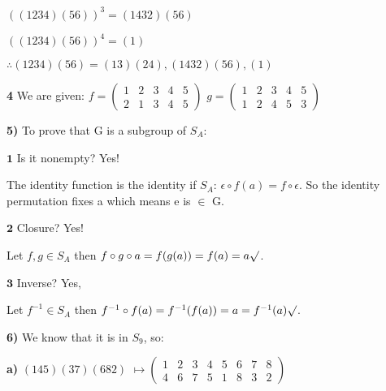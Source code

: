 \documentclass{article}
\begin{document}
\bigskip

$((1234)(56))^3=(1432)(56)$

\bigskip

$((1234)(56))^4=(1)$

\bigskip
\bigskip
$\therefore{(1234)(56)}=(13)(24), (1432)(56), (1)$
				



\bigskip
\bigskip

\bigskip


 \textbf{4} We are given:   $f=(\begin{smallmatrix}
1& 2 & 3 & 4 & 5  \\
2 & 1 & 3 & 4 & 5 
\end{smallmatrix}) $
\hspace {.1in}  $g=(\begin{smallmatrix}
1& 2 & 3 & 4 & 5  \\
1 & 2 & 4 & 5 & 3 
\end{smallmatrix}) $


\newpage

\textbf{5)}
To prove that G is a subgroup of $S_A$:

\bigskip


\hspace{.4in} $\mathbf{1}$ Is it nonempty? Yes!

\medskip

The identity function is the identity if $S_A$:
$\epsilon  \circ f(a)= f\circ \epsilon$.
So the identity permutation fixes a which means e is $\in$ G.


\bigskip

\hspace{.4in} $\mathbf{2}$ Closure? Yes!

\medskip

Let $f, g \in S_A$
then $f \circ g \circ a=f(g(a))=f(a)=a \surd$.

\bigskip


\hspace{.4in} $\mathbf{3}$ Inverse? Yes,

\medskip

Let $f^{-1} \in S_A$
then $f^{-1} \circ f(a)=f^{-1}(f(a))=a=f^{-1}(a) \surd$.



\bigskip




\textbf{6)} We know that it is in $S_9$, so: 

\bigskip


\hspace{.3in}\textbf{a)}
$(145)(37)(682)$             $\mapsto (\begin{smallmatrix}
					1 & 2 & 3 & 4 & 5 & 6 & 7 & 8 \\
					4 & 6 & 7 & 5 & 1 & 8 & 3 & 2
					\end{smallmatrix})$ 
					
\end{document}
